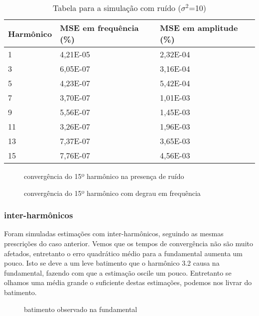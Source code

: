 \documentclass[a4paper, 12pt]{book}
\begin{document}
\begin{table}[h]
	\centering
	\begin{tabular}{|p{2.5cm}|p{2.5cm}|p{2.5cm}|}
		\hline
		Harmônico & MSE em frequência (\%) & MSE em amplitude (\%)\\
		\hline
		1  & 4,21E-05 & 2,32E-04 \\
		3  & 6,05E-07 & 3,16E-04 \\
		5  & 4,23E-07 & 5,42E-04 \\
		7  & 3,70E-07 & 1,01E-03 \\
		9  & 5,56E-07 & 1,45E-03 \\
		11 & 3,26E-07 & 1,96E-03 \\
		13 & 7,37E-07 & 3,65E-03 \\
		15 & 7,76E-07 & 4,56E-03 \\
		\hline
	\end{tabular}
	\caption{Tabela para a simulação com ruído ($\sigma ^2$=10)}
\end{table}

\begin{figure}[h]
	\centering    
	\def\svgscale{1}
	
	\caption{convergência do 15º harmônico na presença de ruído}
	\label{fig:esquema_pll}
\end{figure}

\begin{figure}[h]
	\centering    
	\def\svgscale{1}
	
	\caption{convergência do 15º harmônico com degrau em frequência}
	\label{fig:esquema_pll}
\end{figure}

\subsubsection{inter-harmônicos}

Foram simuladas estimações com inter-harmônicos, seguindo as mesmas prescrições do caso anterior. Vemos que os tempos de convergência não são muito afetados, entretanto o erro quadrático médio para a fundamental aumenta um pouco. Isto se deve a um leve batimento que o harmônico 3.2 causa na fundamental, fazendo com que a estimação oscile um pouco. Entretanto se olhamos uma média grande o suficiente destas estimações, podemos nos livrar do batimento.

\begin{figure}[h]
	\centering    
	\def\svgscale{1}
	
	\caption{batimento observado na fundamental}
	\label{fig:esquema_pll}
\end{figure}
\end{document}
